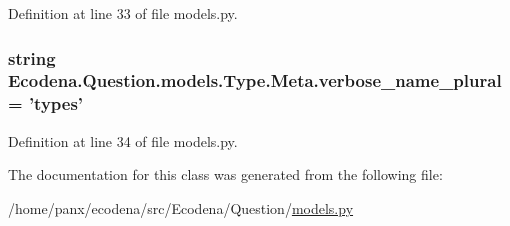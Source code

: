 Definition at line 33 of file models.py.

\hypertarget{class_ecodena_1_1_question_1_1models_1_1_type_1_1_meta_ae1c74aca97a425904b8ee3026812fefe}{
\subsubsection[{verbose\_\-name\_\-plural}]{\setlength{\rightskip}{0pt plus 5cm}string {\bf Ecodena.Question.models.Type.Meta.verbose\_\-name\_\-plural} = 'types'}}
\label{db/d77/class_ecodena_1_1_question_1_1models_1_1_type_1_1_meta_ae1c74aca97a425904b8ee3026812fefe}


Definition at line 34 of file models.py.



The documentation for this class was generated from the following file:\begin{DoxyCompactItemize}
\item 
/home/panx/ecodena/src/Ecodena/Question/\hyperlink{_question_2models_8py}{models.py}\end{DoxyCompactItemize}
